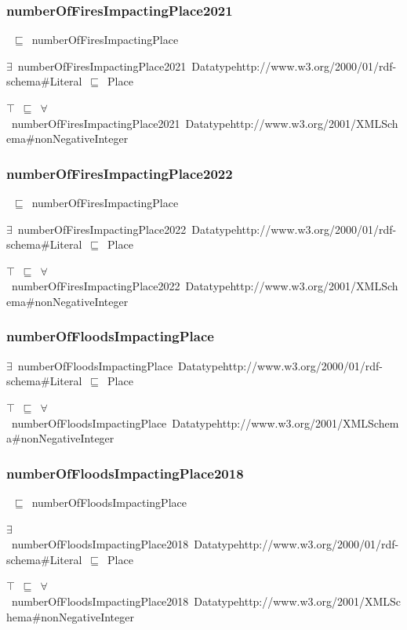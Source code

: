 \documentclass{article}
\begin{document}
\subsubsection*{numberOfFiresImpactingPlace2021}

~\ensuremath{\sqsubseteq}~numberOfFiresImpactingPlace

\ensuremath{\exists}~numberOfFiresImpactingPlace2021~Datatypehttp://www.w3.org/2000/01/rdf-schema#Literal~\ensuremath{\sqsubseteq}~Place

\ensuremath{\top}~\ensuremath{\sqsubseteq}~\ensuremath{\forall}~numberOfFiresImpactingPlace2021~Datatypehttp://www.w3.org/2001/XMLSchema#nonNegativeInteger

\subsubsection*{numberOfFiresImpactingPlace2022}

~\ensuremath{\sqsubseteq}~numberOfFiresImpactingPlace

\ensuremath{\exists}~numberOfFiresImpactingPlace2022~Datatypehttp://www.w3.org/2000/01/rdf-schema#Literal~\ensuremath{\sqsubseteq}~Place

\ensuremath{\top}~\ensuremath{\sqsubseteq}~\ensuremath{\forall}~numberOfFiresImpactingPlace2022~Datatypehttp://www.w3.org/2001/XMLSchema#nonNegativeInteger

\subsubsection*{numberOfFloodsImpactingPlace}

\ensuremath{\exists}~numberOfFloodsImpactingPlace~Datatypehttp://www.w3.org/2000/01/rdf-schema#Literal~\ensuremath{\sqsubseteq}~Place

\ensuremath{\top}~\ensuremath{\sqsubseteq}~\ensuremath{\forall}~numberOfFloodsImpactingPlace~Datatypehttp://www.w3.org/2001/XMLSchema#nonNegativeInteger

\subsubsection*{numberOfFloodsImpactingPlace2018}

~\ensuremath{\sqsubseteq}~numberOfFloodsImpactingPlace

\ensuremath{\exists}~numberOfFloodsImpactingPlace2018~Datatypehttp://www.w3.org/2000/01/rdf-schema#Literal~\ensuremath{\sqsubseteq}~Place

\ensuremath{\top}~\ensuremath{\sqsubseteq}~\ensuremath{\forall}~numberOfFloodsImpactingPlace2018~Datatypehttp://www.w3.org/2001/XMLSchema#nonNegativeInteger
\end{document}
